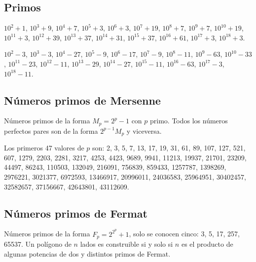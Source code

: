 \documentclass[11pt]{article}
\begin{document}
		\subsection{Primos}
			$10^2+1$, $10^3+9$, $10^4+7$, $10^5+3$, $10^6+3$, $10^7+19$, $10^8+7$, $10^9+7$, $10^{10}+19$, $10^{11}+3$, $10^{12}+39$, $10^{13}+37$, $10^{14}+31$, $10^{15}+37$, $10^{16}+61$, $10^{17}+3$, $10^{18}+3$.
			
			$10^2-3$, $10^3-3$, $10^4-27$, $10^5-9$, $10^6-17$, $10^7-9$, $10^8-11$, $10^9-63$, $10^{10}-33$, $10^{11}-23$, $10^{12}-11$, $10^{13}-29$, $10^{14}-27$, $10^{15}-11$, $10^{16}-63$, $10^{17}-3$, $10^{18}-11$.
		
		\subsection{Números primos de Mersenne}
			Números primos de la forma $M_p=2^p-1$ con $p$ primo. Todos los números perfectos pares son de la forma $2^{p-1}M_p$ y viceversa.
		
			Los primeros 47 valores de $p$ son: 2, 3, 5, 7, 13, 17, 19, 31, 61, 89, 107, 127, 521, 607, 1279, 2203, 2281, 3217, 4253, 4423, 9689, 9941, 11213, 19937, 21701, 23209, 44497, 86243, 110503, 132049, 216091, 756839, 859433, 1257787, 1398269, 2976221, 3021377, 6972593, 13466917, 20996011, 24036583, 25964951, 30402457, 32582657, 37156667, 42643801, 43112609.
		
		\subsection{Números primos de Fermat}
			Números primos de la forma $F_p=2^{2^p}+1$, solo se conocen cinco: 3, 5, 17, 257, 65537. Un polígono de $n$ lados es construible si y solo si $n$ es el producto de algunas potencias de dos y distintos primos de Fermat.
\end{document}
